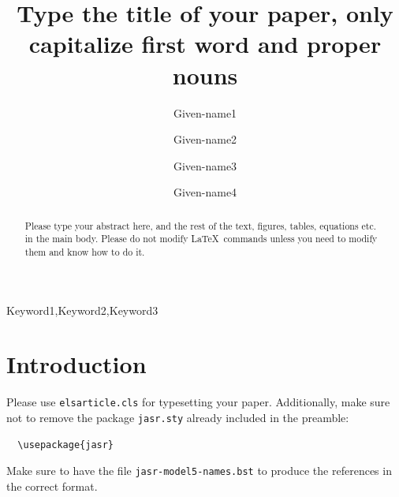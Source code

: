 \documentclass[times,twocolumn,final,authoryear]{elsarticle}
\begin{document}

\begin{frontmatter}

\title{Type the title of your paper, only capitalize first
word and proper nouns}%

\author[1]{Given-name1 }
\author[1]{Given-name2 }
\author[2]{Given-name3 }
\author[2]{Given-name4 }

\address[1]{Affiliation 1, Address, City and Postal Code, Country}
\address[2]{Affiliation 2, Address, City and Postal Code, Country}



\begin{abstract}
Please type your abstract here, and the rest of the text, figures,
tables, equations etc. in the main body. Please do not modify LaTeX\ 
commands unless you need to modify them and know how to do it.
\end{abstract}

\begin{keyword}
\KWD Keyword1\sep Keyword2\sep Keyword3
\end{keyword}

\end{frontmatter}

\linenumbers

\section{Introduction}
\label{sec1}
Please use \verb+elsarticle.cls+ for typesetting your paper. Additionally,
make sure not to remove the package \verb+jasr.sty+ already included in the
preamble:
\begin{verbatim} 
  \usepackage{jasr}
\end{verbatim}

Make sure to have the file \verb+jasr-model5-names.bst+ to produce the references in
the correct format. 
\end{document}
